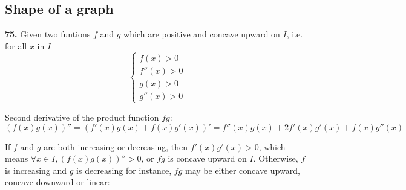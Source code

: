 \documentclass[a4paper,12pt]{article}
\begin{document}
\subsection{Shape of a graph}
\textbf{75. }Given two funtions $f$ and $g$ which are positive and concave
upward on $I$, i.e. for all $x$ in $I$
\[\begin{cases}
    f(x) > 0\\
    f''(x) > 0\\
    g(x) > 0\\
    g''(x) > 0
  \end{cases}\]

Second derivative of the product function $fg$:
\[(f(x)g(x))'' = (f'(x)g(x) + f(x)g'(x))'
  = f''(x)g(x) + 2f'(x)g'(x) + f(x)g''(x)\]

If $f$ and $g$ are both increasing or decreasing, then $f'(x)g'(x) > 0$, which
means $\forall x \in I, (f(x)g(x))'' > 0$, or $fg$ is concave upward on $I$.
Otherwise, $f$ is increasing and $g$ is decreasing for instance, $fg$ may be
either concave upward, concave downward or linear:
\end{document}
